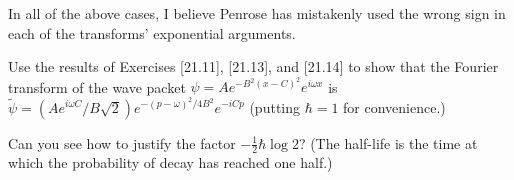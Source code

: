\documentclass[../road-to-reality.tex]{subfiles}
\begin{document}
\begin{questions}
\begin{solution}
	In all of the above cases, I believe Penrose has mistakenly used the wrong sign in each of the transforms' exponential arguments.
\end{solution}

\question Use the results of Exercises [21.11], [21.13], and [21.14] to show that the Fourier transform of the wave packet $\psi = Ae^{-B^2(x-C)^2}e^{i\omega{x}}$ is $\tilde{\psi}=(Ae^{i\omega{C}}/B\sqrt{2})e^{-(p-\omega)^2/4B^2}e^{-iCp}$ (putting $\hbar=1$ for convenience.)

\question Can you see how to justify the factor $-\frac{1}{2}\hbar\log{2}$? (The half-life is the time at which the probability of decay has reached one half.)

\end{questions}
\end{document}
